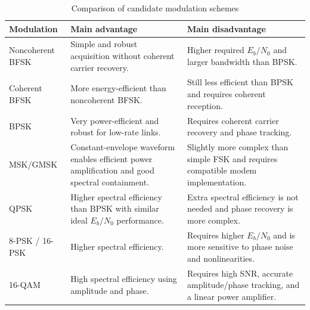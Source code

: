 \begin{table}[H]
    \centering
    \small
    \caption{Comparison of candidate modulation schemes}
    \label{tab:modulation_tradeoff}
    \begin{tabularx}{\textwidth}{p{} X X}
        \toprule
        \textbf{Modulation} & \textbf{Main advantage} & \textbf{Main disadvantage} \\
        \midrule
        Noncoherent BFSK & Simple and robust acquisition without coherent carrier recovery. & Higher required \(E_b/N_0\) and larger bandwidth than BPSK. \\
        \midrule
        Coherent BFSK & More energy-efficient than noncoherent BFSK. & Still less efficient than BPSK and requires coherent reception. \\
        \midrule
        BPSK & Very power-efficient and robust for low-rate links. & Requires coherent carrier recovery and phase tracking. \\
        \midrule
        MSK/GMSK & Constant-envelope waveform enables efficient power amplification and good spectral containment. & Slightly more complex than simple FSK and requires compatible modem implementation. \\
        \midrule
        QPSK & Higher spectral efficiency than BPSK with similar ideal \(E_b/N_0\) performance. & Extra spectral efficiency is not needed and phase recovery is more complex. \\
        \midrule
        8-PSK / 16-PSK & Higher spectral efficiency. & Requires higher \(E_b/N_0\) and is more sensitive to phase noise and nonlinearities. \\
        \midrule
        16-QAM & High spectral efficiency using amplitude and phase. & Requires high SNR, accurate amplitude/phase tracking, and a linear power amplifier. \\
        \bottomrule
    \end{tabularx}
\end{table}

